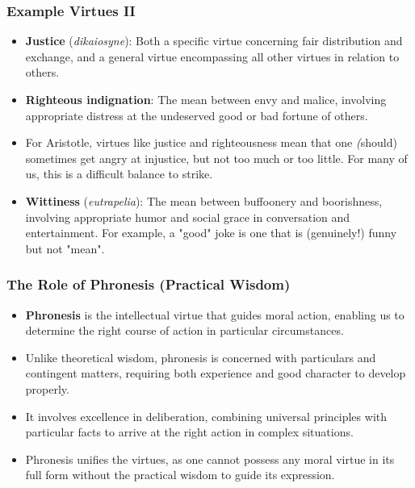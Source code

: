\documentclass{beamer}
\begin{document}
\begin{frame}
    \frametitle{Example Virtues II}
    \begin{itemize}
        \item \textbf{Justice} (\textit{dikaiosyne}): Both a specific virtue concerning fair distribution and exchange, and a general virtue encompassing all other virtues in relation to others.
        
        \item \textbf{Righteous indignation}: The mean between envy and malice, involving appropriate distress at the undeserved good or bad fortune of others.
        
        \item For Aristotle, virtues like justice and righteousness mean that one \emph(should) sometimes get angry at injustice, but not too much or too little. For many of us, this is a difficult balance to strike.
        
        \item \textbf{Wittiness} (\textit{eutrapelia}): The mean between buffoonery and boorishness, involving appropriate humor and social grace in conversation and entertainment. For example, a "good" joke is one that is (genuinely!) funny but not "mean".
    \end{itemize}
\end{frame}

\begin{frame}
    \frametitle{The Role of Phronesis (Practical Wisdom)}
    \begin{itemize}
        \item \textbf{Phronesis} is the intellectual virtue that guides moral action, enabling us to determine the right course of action in particular circumstances.
        
        \item Unlike theoretical wisdom, phronesis is concerned with particulars and contingent matters, requiring both experience and good character to develop properly.
        
        \item It involves excellence in deliberation, combining universal principles with particular facts to arrive at the right action in complex situations.
        
        \item Phronesis unifies the virtues, as one cannot possess any moral virtue in its full form without the practical wisdom to guide its expression.
    \end{itemize}
\end{frame}
\end{document}
